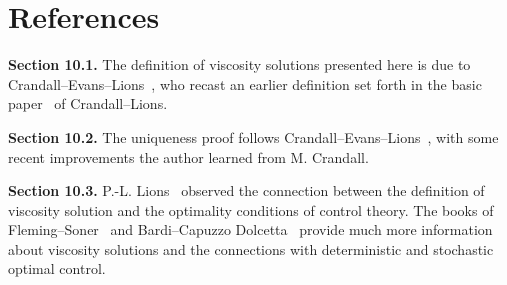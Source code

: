 \section{References}
\label{sec:hj-references}

\noindent\textbf{Section 10.1.} The definition of viscosity solutions presented here is due to Crandall--Evans--Lions~\cite{CrandallEvansLions1984}, who recast an earlier definition set forth in the basic paper~\cite{CrandallLions1983} of Crandall--Lions.

\noindent\textbf{Section 10.2.} The uniqueness proof follows Crandall--Evans--Lions~\cite{CrandallEvansLions1984}, with some recent improvements the author learned from M. Crandall.

\noindent\textbf{Section 10.3.} P.-L. Lions~\cite{PLLions1982} observed the connection between the definition of viscosity solution and the optimality conditions of control theory. The books of Fleming--Soner~\cite{FlemingSoner1993} and Bardi--Capuzzo Dolcetta~\cite{BardiCapuzzoDolcetta1997} provide much more information about viscosity solutions and the connections with deterministic and stochastic optimal control.
